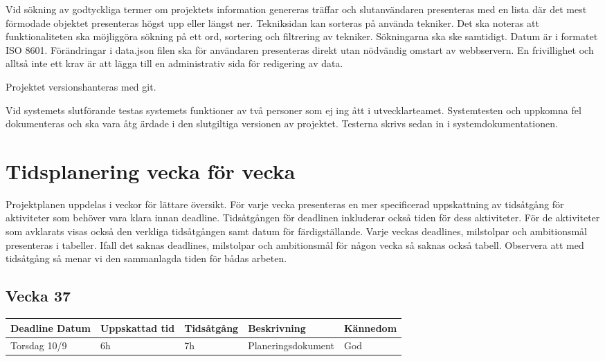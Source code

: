 \documentclass{TDP003mall}
\begin{document}
Vid sökning av godtyckliga termer om projektets information genereras träffar och
 slutanvändaren presenteras med en lista där det mest förmodade objektet presenteras
 högst upp eller längst ner. Tekniksidan kan sorteras på använda tekniker. Det ska
 noteras att funktionaliteten ska möjliggöra sökning på ett ord, sortering och filtrering
 av tekniker. Sökningarna ska ske samtidigt. Datum är i formatet ISO 8601. Förändringar
 i data.json filen ska för användaren presenteras direkt utan nödvändig omstart av
 webbservern. En frivillighet och alltså inte ett krav är att lägga till en administrativ
 sida för redigering av data.

Projektet versionshanteras med git.

Vid systemets slutförande testas systemets funktioner av två personer som ej ing
ått i utvecklarteamet. Systemtesten och uppkomna fel dokumenteras och ska vara åtg
ärdade i den slutgiltiga versionen av projektet. Testerna skrivs sedan in i systemdokumentationen.


\section{Tidsplanering vecka för vecka}
Projektplanen uppdelas i veckor för lättare översikt. För varje vecka presenteras
 en mer specificerad uppskattning av tidsåtgång för aktiviteter som behöver vara
 klara innan deadline. Tidsåtgången för deadlinen inkluderar också tiden för dess
 aktiviteter. För de aktiviteter som avklarats visas också den verkliga tidsåtgången
 samt datum för färdigställande. Varje veckas deadlines, milstolpar och ambitionsmål presenteras
 i tabeller. Ifall det saknas deadlines, milstolpar och ambitionsmål för någon vecka så saknas också
 tabell. Observera att med tidsåtgång så menar vi den sammanlagda tiden för bådas arbeten.

\subsection{Vecka 37}
\begin{tabularx}{\linewidth}{|l|l|l|X|l|}
	\hline
	Deadline Datum & Uppskattad tid & Tidsåtgång & Beskrivning        & Kännedom \\ [0.5ex]
	\hline
	Torsdag 10/9   & 6h             & 7h         & Planeringsdokument & God      \\
	\hline
\end{tabularx}{\linewidth}
\end{document}
